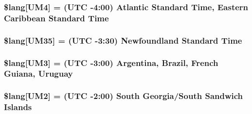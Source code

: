 \subsubsection[{\$lang}]{\setlength{\rightskip}{0pt plus 5cm}\$lang\mbox{[}\textquotesingle{}U\+M4\textquotesingle{}\mbox{]} = \textquotesingle{}(U\+T\+C -\/4\+:00) Atlantic Standard Time, Eastern Caribbean Standard Time\textquotesingle{}}\label{_admin_2system_2language_2english_2date__lang_8php_a42f66872f4a082bcb2ee004bd2716828}
\hypertarget{_admin_2system_2language_2english_2date__lang_8php_a389c4a60af83efd29503f60033f3071d}{}
\subsubsection[{\$lang}]{\setlength{\rightskip}{0pt plus 5cm}\$lang\mbox{[}\textquotesingle{}U\+M35\textquotesingle{}\mbox{]} = \textquotesingle{}(U\+T\+C -\/3\+:30) Newfoundland Standard Time\textquotesingle{}}\label{_admin_2system_2language_2english_2date__lang_8php_a389c4a60af83efd29503f60033f3071d}
\hypertarget{_admin_2system_2language_2english_2date__lang_8php_abd67512895187d494bbfb18f8d8fee43}{}
\subsubsection[{\$lang}]{\setlength{\rightskip}{0pt plus 5cm}\$lang\mbox{[}\textquotesingle{}U\+M3\textquotesingle{}\mbox{]} = \textquotesingle{}(U\+T\+C -\/3\+:00) Argentina, Brazil, French Guiana, Uruguay\textquotesingle{}}\label{_admin_2system_2language_2english_2date__lang_8php_abd67512895187d494bbfb18f8d8fee43}
\hypertarget{_admin_2system_2language_2english_2date__lang_8php_a8ee2f132b462bb709fc3402a592ff573}{}
\subsubsection[{\$lang}]{\setlength{\rightskip}{0pt plus 5cm}\$lang\mbox{[}\textquotesingle{}U\+M2\textquotesingle{}\mbox{]} = \textquotesingle{}(U\+T\+C -\/2\+:00) South Georgia/South Sandwich Islands\textquotesingle{}}\label{_admin_2system_2language_2english_2date__lang_8php_a8ee2f132b462bb709fc3402a592ff573}
\hypertarget{_admin_2system_2language_2english_2date__lang_8php_a036e0074236b996b33231b051eda2973}{}
